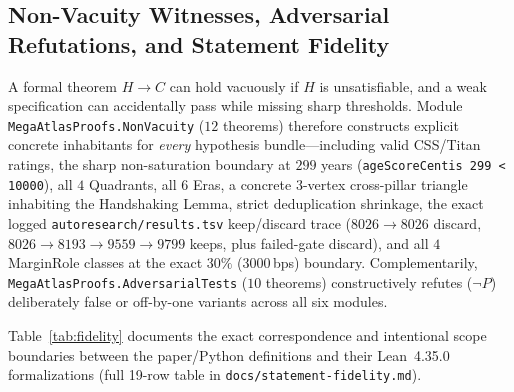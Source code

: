 \documentclass[11pt,reqno]{amsart}
\theoremstyle{plain}
\theoremstyle{definition}
\newcommand{\code}[1]{{\footnotesize\nolinkurl{#1}}}
\begin{document}
\subsection{Non-Vacuity Witnesses, Adversarial Refutations, and Statement Fidelity}
A formal theorem $H \to C$ can hold vacuously if $H$ is unsatisfiable, and a weak specification can accidentally pass while missing sharp thresholds. Module \code{MegaAtlasProofs.NonVacuity} ($12$ theorems) therefore constructs explicit concrete inhabitants for \emph{every} hypothesis bundle---including valid CSS/Titan ratings, the sharp non-saturation boundary at $299$ years (\code{ageScoreCentis 299 < 10000}), all $4$ Quadrants, all $6$ Eras, a concrete $3$-vertex cross-pillar triangle inhabiting the Handshaking Lemma, strict deduplication shrinkage, the exact logged \code{autoresearch/results.tsv} keep/discard trace ($8026 \to 8026$ discard, $8026 \to 8193 \to 9559 \to 9799$ keeps, plus failed-gate discard), and all $4$ MarginRole classes at the exact $30\%$ ($3000$\,bps) boundary. Complementarily, \code{MegaAtlasProofs.AdversarialTests} ($10$ theorems) constructively refutes ($\neg P$) deliberately false or off-by-one variants across all six modules.

Table~\ref{tab:fidelity} documents the exact correspondence and intentional scope boundaries between the paper/Python definitions and their Lean~4.35.0 formalizations (full 19-row table in \code{docs/statement-fidelity.md}).
\end{document}
